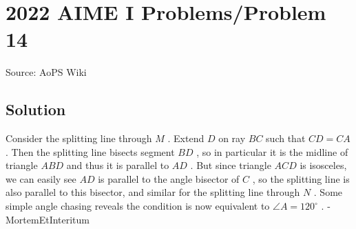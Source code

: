\documentclass[12pt]{article}
\begin{document}
\section*{{2022 AIME I Problems/Problem 14}}
Source: AoPS Wiki

\subsection*{Solution}
Consider the splitting line through $M$ . Extend $D$ on ray $BC$ such that $CD=CA$ . Then the splitting line bisects segment $BD$ , so in particular it is the midline of triangle $ABD$ and thus it is parallel to $AD$ . But since triangle $ACD$ is isosceles, we can easily see $AD$ is parallel to the angle bisector of $C$ , so the splitting line is also parallel to this bisector, and similar for the splitting line through $N$ . Some simple angle chasing reveals the condition is now equivalent to $\angle A=120^\circ$ . - MortemEtInteritum
\end{document}
